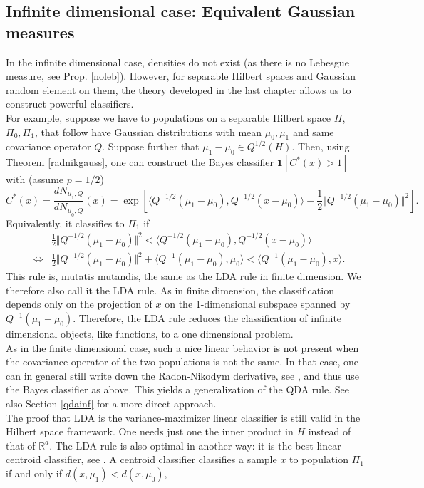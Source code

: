 \documentclass[10pt, a4paper]{report}
\newcommand{\R}[0]{\mathbb{R}}
\theoremstyle{definition}
\theoremstyle{remark}
\begin{document}
\subsection{Infinite dimensional case: Equivalent Gaussian measures}
In the infinite dimensional case, densities do not exist (as there is no Lebesgue measure, see Prop. \ref{noleb}). However, for separable Hilbert spaces and Gaussian random element on them, the theory developed in the last chapter allows us to construct powerful classifiers. \\
For example, suppose we have to populations on a separable Hilbert space $H$, $\Pi_0,\Pi_1$, that follow have Gaussian distributions with mean $\mu_0,\mu_1$ and same covariance operator $Q$. Suppose further that $\mu_1-\mu_0 \in Q^{1/2}(H)$. Then, using Theorem \ref{radnikgauss}, one can construct the Bayes classifier $\mathbf{1}[C^*(x)>1]$ with (assume $p=1/2$)
$$C^*(x) = \frac{dN_{\mu_1,Q}}{dN_{\mu_0,Q}}(x) =  \exp\left[\langle Q^{-1/2}(\mu_1-\mu_0),Q^{-1/2}(x-\mu_0)\rangle - \frac{1}{2} \Vert Q^{-1/2}(\mu_1-\mu_0)\Vert^2 \right].$$
Equivalently, it classifies to $\Pi_1$ if 
\begin{eqnarray*}
	& & \frac{1}{2} \Vert Q^{-1/2}(\mu_1-\mu_0)\Vert^2 <\langle Q^{-1/2}(\mu_1-\mu_0),Q^{-1/2}(x-\mu_0)\rangle  \\
	& \iff & \frac{1}{2} \Vert Q^{-1/2}(\mu_1-\mu_0)\Vert^2 + \langle Q^{-1}(\mu_1-\mu_0),\mu_0\rangle < \langle Q^{-1}(\mu_1-\mu_0),x\rangle.
\end{eqnarray*}
This rule is, mutatis mutandis, the same as the LDA rule in finite dimension. We therefore also call it the LDA rule. As in finite dimension, the classification depends only on the projection of $x$ on the 1-dimensional subspace spanned by $Q^{-1}(\mu_1-\mu_0)$. Therefore, the LDA rule reduces the classification of infinite dimensional objects, like functions, to a one dimensional problem.\\
As in the finite dimensional case, such a nice linear behavior is not present when the covariance operator of the two populations is not the same. In that case, one can in general still write down the Radon-Nikodym derivative, see \cite[Coro. 6.4.11]{boga}, and thus use the Bayes classifier as above. This yields a generalization of the QDA rule. See also Section \ref{qdainf} for a more direct approach.  \\
The proof that LDA is the variance-maximizer linear classifier is still valid in the Hilbert space framework. One needs just one the inner product in $H$ instead of that of $\R^d$. The LDA rule is also optimal in another way: it is the best linear centroid classifier, see \cite[Section 2.2]{DH3}. A centroid classifier classifies a sample $x$ to population $\Pi_1$ if and only if $d(x,\mu_1)<d(x,\mu_0)$,
\end{document}
